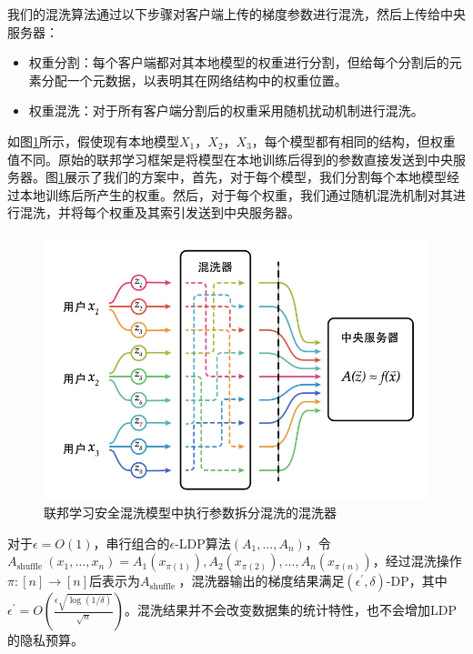 我们的混洗算法通过以下步骤对客户端上传的梯度参数进行混洗，然后上传给中央服务器：
\begin{itemize}
	\item 权重分割：每个客户端都对其本地模型的权重进行分割，但给每个分割后的元素分配一个元数据，以表明其在网络结构中的权重位置。
	\item 权重混洗：对于所有客户端分割后的权重采用随机扰动机制进行混洗。
\end{itemize}

如图\ref{fig:联邦学习安全混洗模型中执行参数拆分混洗的混洗器}所示，假使现有本地模型$X_{1}$，$X_{2}$，$X_{3}$，每个模型都有相同的结构，但权重值不同。原始的联邦学习框架是将模型在本地训练后得到的参数直接发送到中央服务器。图\ref{fig:联邦学习安全混洗模型中执行参数拆分混洗的混洗器}展示了我们的方案中，首先，对于每个模型，我们分割每个本地模型经过本地训练后所产生的权重。然后，对于每个权重，我们通过随机混洗机制对其进行混洗，并将每个权重及其索引发送到中央服务器。

\begin{figure}[!hbt]
\centering
	\includegraphics[scale=0.6]{fig2/C4/拆分混洗}%
	\caption{联邦学习安全混洗模型中执行参数拆分混洗的混洗器}
	\label{fig:联邦学习安全混洗模型中执行参数拆分混洗的混洗器}	
\end{figure}

对于$\epsilon=O(1)$，串行组合的$\epsilon$-LDP算法$\left(A_{1}, \ldots, A_{n}\right)$，令$A_{\text {shuffle }}\left(x_{1}, \ldots, x_{n}\right)=A_{1}\left(x_{\pi(1)}\right), A_{2}\left(x_{\pi(2)}\right), \ldots, A_{n}\left(x_{\pi(n)}\right)$，经过混洗操作$\pi:[n] \rightarrow[n]$后表示为$A_{\text {shuffle }}$，混洗器输出的梯度结果满足$\left(\epsilon^{\prime}, \delta\right)$-DP，其中$\epsilon^{\prime}=O\left(\frac{\epsilon \sqrt{\log (1 / \delta)}}{\sqrt{n}}\right)$。混洗结果并不会改变数据集的统计特性，也不会增加LDP的隐私预算。

